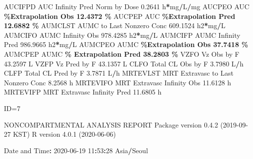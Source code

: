 \documentclass[
  10pt,
]{krantz}
\makeatletter
\newenvironment{Shaded}{\begin{snugshade}}{\end{snugshade}}
\newcommand{\DecValTok}[1]{\textcolor[rgb]{0.00,0.00,0.81}{#1}}
\newcommand{\FloatTok}[1]{\textcolor[rgb]{0.00,0.00,0.81}{#1}}
\newcommand{\NormalTok}[1]{#1}
\newcommand{\OperatorTok}[1]{\textcolor[rgb]{0.81,0.36,0.00}{\textbf{#1}}}
\newcommand{\StringTok}[1]{\textcolor[rgb]{0.31,0.60,0.02}{#1}}
\newenvironment{kframe}{%
\medskip{}
\setlength{\fboxsep}{.8em}
 \def\at@end@of@kframe{}%
 \ifinner\ifhmode%
  \def\at@end@of@kframe{\end{minipage}}%
  \begin{minipage}{\columnwidth}%
 \fi\fi%
 \def\FrameCommand##1{\hskip\@totalleftmargin \hskip-\fboxsep
 \colorbox{shadecolor}{##1}\hskip-\fboxsep
     \hskip-\linewidth \hskip-\@totalleftmargin \hskip\columnwidth}%
 \MakeFramed {\advance\hsize-\width
   \@totalleftmargin\z@ \linewidth\hsize
   \@setminipage}}%
 {\par\unskip\endMakeFramed%
 \at@end@of@kframe}
\renewenvironment{Shaded}{\begin{kframe}}{\end{kframe}}
\makeatother
\begin{document}
\begin{Shaded}
\begin{Highlighting}[]
\NormalTok{AUCIFPD    AUC Infinity Pred Norm by Dose                  }\FloatTok{0.2641}\NormalTok{ h}\OperatorTok{*}\NormalTok{mg}\OperatorTok{/}\NormalTok{L}\OperatorTok{/}\NormalTok{mg}
\NormalTok{AUCPEO     AUC }\OperatorTok{\%Extrapolation Obs                         12.4372 \%}
\NormalTok{AUCPEP     AUC }\OperatorTok{\%Extrapolation Pred                        12.6882 \%}
\NormalTok{AUMCLST    AUMC to Last Nonzero Conc                     }\FloatTok{609.1524}\NormalTok{ h2}\OperatorTok{*}\NormalTok{mg}\OperatorTok{/}\NormalTok{L}
\NormalTok{AUMCIFO    AUMC Infinity Obs                             }\FloatTok{978.4285}\NormalTok{ h2}\OperatorTok{*}\NormalTok{mg}\OperatorTok{/}\NormalTok{L}
\NormalTok{AUMCIFP    AUMC Infinity Pred                            }\FloatTok{986.9665}\NormalTok{ h2}\OperatorTok{*}\NormalTok{mg}\OperatorTok{/}\NormalTok{L}
\NormalTok{AUMCPEO    AUMC }\OperatorTok{\%Extrapolation Obs                        37.7418 \%}
\NormalTok{AUMCPEP    AUMC }\OperatorTok{\% Extrapolation Pred                      38.2803 \%}
\NormalTok{VZFO       Vz Obs by F                                    }\FloatTok{43.2597}\NormalTok{ L}
\NormalTok{VZFP       Vz Pred by F                                   }\FloatTok{43.1357}\NormalTok{ L}
\NormalTok{CLFO       Total CL Obs by F                               }\FloatTok{3.7980}\NormalTok{ L}\OperatorTok{/}\NormalTok{h}
\NormalTok{CLFP       Total CL Pred by F                              }\FloatTok{3.7871}\NormalTok{ L}\OperatorTok{/}\NormalTok{h}
\NormalTok{MRTEVLST   MRT Extravasc to Last Nonzero Conc              }\FloatTok{8.2568}\NormalTok{ h}
\NormalTok{MRTEVIFO   MRT Extravasc Infinity Obs                     }\FloatTok{11.6128}\NormalTok{ h}
\NormalTok{MRTEVIFP   MRT Extravasc Infinity Pred                    }\FloatTok{11.6805}\NormalTok{ h}





\NormalTok{ID=}\DecValTok{7}

\NormalTok{                        NONCOMPARTMENTAL ANALYSIS REPORT}
\NormalTok{                       Package version }\DecValTok{0}\NormalTok{.}\FloatTok{4.2}\NormalTok{ (}\DecValTok{2019{-}09{-}27}\NormalTok{ KST)}
\NormalTok{                          R version }\DecValTok{4}\NormalTok{.}\FloatTok{0.1}\NormalTok{ (}\DecValTok{2020{-}06{-}06}\NormalTok{)}

\NormalTok{Date and Time}\OperatorTok{:}\StringTok{ }\DecValTok{2020{-}06{-}19} \DecValTok{11}\OperatorTok{:}\DecValTok{53}\OperatorTok{:}\DecValTok{28}\NormalTok{ Asia}\OperatorTok{/}\NormalTok{Seoul}


\end{Highlighting}
\end{Shaded}
\end{document}
